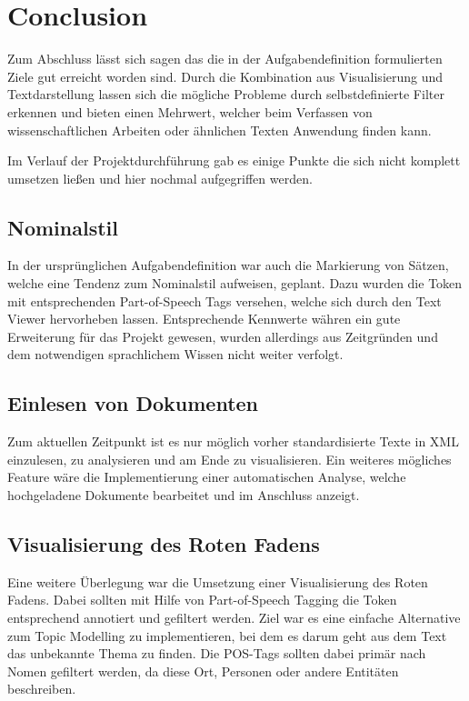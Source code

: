 \section{Conclusion}
Zum Abschluss lässt sich sagen das die in der Aufgabendefinition formulierten Ziele gut erreicht worden sind. Durch die Kombination aus Visualisierung und Textdarstellung lassen sich die mögliche Probleme durch selbstdefinierte Filter erkennen und bieten einen Mehrwert, welcher beim Verfassen von wissenschaftlichen Arbeiten oder ähnlichen Texten Anwendung finden kann. 

Im Verlauf der Projektdurchführung gab es einige Punkte die sich nicht komplett umsetzen ließen und hier nochmal aufgegriffen werden.\\

\subsection*{Nominalstil}
In der ursprünglichen Aufgabendefinition war auch die Markierung von Sätzen, welche eine Tendenz zum Nominalstil aufweisen, geplant. Dazu wurden die Token mit entsprechenden Part-of-Speech Tags versehen, welche sich durch den Text Viewer hervorheben lassen. Entsprechende Kennwerte währen ein gute Erweiterung für das Projekt gewesen, wurden allerdings aus Zeitgründen und dem notwendigen sprachlichem Wissen nicht weiter verfolgt.

\subsection*{Einlesen von Dokumenten}
Zum aktuellen Zeitpunkt ist es nur möglich vorher standardisierte Texte in XML einzulesen, zu analysieren und am Ende zu visualisieren. Ein weiteres mögliches Feature wäre die Implementierung einer automatischen Analyse, welche hochgeladene Dokumente bearbeitet und im Anschluss anzeigt.

\subsection*{Visualisierung des Roten Fadens}
Eine weitere Überlegung war die Umsetzung einer Visualisierung des Roten Fadens. Dabei sollten mit Hilfe von Part-of-Speech Tagging die Token entsprechend annotiert und gefiltert werden. Ziel war es eine einfache Alternative zum Topic Modelling zu implementieren, bei dem es darum geht aus dem Text das unbekannte Thema zu finden. Die POS-Tags sollten dabei primär nach Nomen gefiltert werden, da diese Ort, Personen oder andere Entitäten beschreiben.

